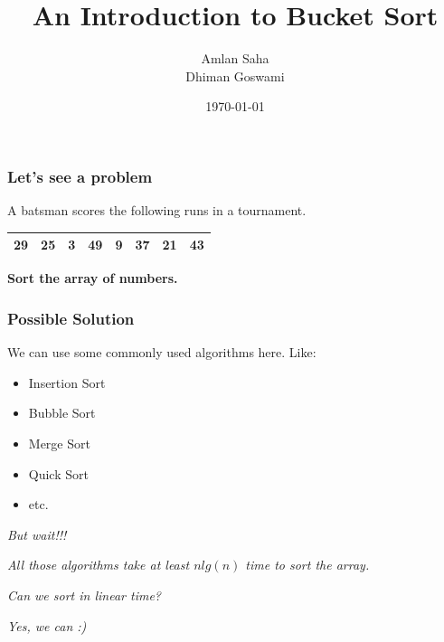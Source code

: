 \documentclass[pdf]{beamer}
\title{An Introduction to Bucket Sort}
\author{Amlan Saha\\Dhiman Goswami}
\institute{Bangladesh University of Engineering and Technology\\Dhaka, Bangladesh}
\date{\today}
\begin{document}
\begin{frame}
\titlepage
\end{frame}

\begin{frame}
	\frametitle{Let's see a problem}
		\pause
		A batsman scores the following runs in a tournament.
		\pause
		\begin{table}[h]
			\centering
			\begin{tabular}{|c|c|c|c|c|c|c|c|}
				\hline
				29 & 25 & 3 & 49 & 9 & 37 & 21 & 43\\
				\hline
			\end{tabular}
		\end{table}
		\pause
		\textbf{Sort the array of numbers.}		
\end{frame}

\begin{frame}
	\frametitle{Possible Solution}
	\pause
	We can use some commonly used algorithms here. Like:
	\pause
	\begin{itemize}
		\item Insertion Sort
		\pause
		\item Bubble Sort
		\pause
		\item Merge Sort
		\pause
		\item Quick Sort
		\pause
		\item etc.
	\end{itemize}
\end{frame}

\begin{frame}
	\begin{block}{
		\color{red}
		\textit{But wait!!!}}
	\end{block}
	\pause
	\begin{block}{
		\color{red}
		\textit{All those algorithms take at least $n lg(n)$ time to sort the array.}}
	\end{block}
	\pause
	\begin{block}{
		\color{blue}
		\textit{Can we sort in linear time?}}
	\end{block}

	\pause
	\begin{block}{
		\color{olivegreen}\textit{Yes, we can :)}}
	\end{block}	
\end{frame}
\end{document}
